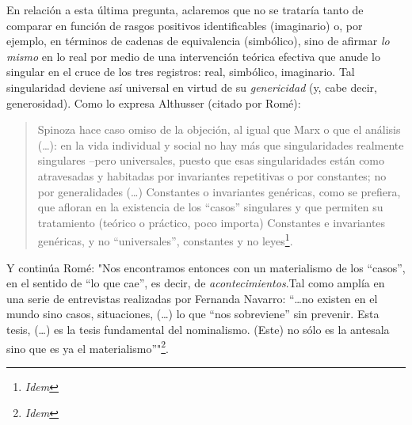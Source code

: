 \documentclass{book}
\begin{document}
En relación a esta última pregunta, aclaremos que no se trataría tanto
de comparar en función de rasgos positivos identificables (imaginario)
o, por ejemplo, en términos de cadenas de equivalencia (simbólico), sino
de afirmar \emph{lo mismo} en lo real por medio de una intervención
teórica efectiva que anude lo singular en el cruce de los tres
registros: real, simbólico, imaginario. Tal singularidad deviene así
universal en virtud de su \emph{genericidad} (y, cabe decir,
generosidad). Como lo expresa Althusser (citado por Romé):

\begin{quote}
Spinoza hace caso omiso de la objeción, al igual que Marx o que el
análisis (\ldots): en la vida individual y social no hay más que
singularidades realmente singulares --pero universales, puesto que esas
singularidades están como atravesadas y habitadas por invariantes
repetitivas o por constantes; no por generalidades (\ldots) Constantes o
invariantes genéricas, como se prefiera, que afloran en la existencia de
los ``casos'' singulares y que permiten su tratamiento (teórico o
práctico, poco importa) Constantes e invariantes genéricas, y no
``universales'', constantes y no leyes\footnote{\emph{Idem}}.
\end{quote}

Y continúa Romé: "Nos encontramos entonces con un materialismo de los
``casos'', en el sentido de ``lo que cae'', es decir, de
\emph{acontecimientos}.Tal como amplía en una serie de entrevistas
realizadas por Fernanda Navarro: ``\ldots no existen en el mundo sino
casos, situaciones, (\ldots) lo que ``nos sobreviene'' sin prevenir.
Esta tesis, (\ldots) es la tesis fundamental del nominalismo. (Este) no
sólo es la antesala sino que es ya el materialismo''"\footnote{\emph{Idem}}.
\end{document}
